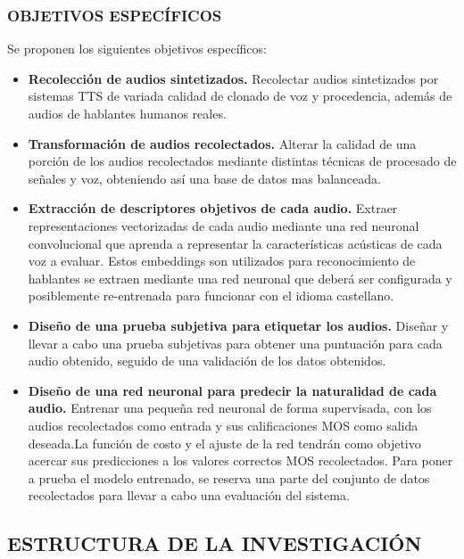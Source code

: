 \subsubsection{OBJETIVOS ESPECÍFICOS}
Se proponen los siguientes objetivos específicos:
\begin{itemize}
    
 \item \textbf{Recolección de audios sintetizados.} 
Recolectar audios sintetizados por sistemas TTS de variada calidad de clonado de voz y procedencia, además de audios de hablantes humanos reales. 
\item \textbf{Transformación de audios recolectados.}
Alterar la calidad de una porción de los audios recolectados mediante distintas técnicas de procesado de señales y voz, obteniendo así una base de datos mas balanceada.
\item \textbf{Extracción de descriptores objetivos de cada audio.}
Extraer representaciones vectorizadas de cada audio mediante una red neuronal convolucional que aprenda a representar la características acústicas de cada voz a evaluar. Estos embeddings son utilizados para reconocimiento de hablantes se extraen mediante una red neuronal que deberá ser configurada y posiblemente re-entrenada para funcionar con el idioma castellano.
\item \textbf{Diseño de una prueba subjetiva para etiquetar los audios. }
Diseñar y llevar a cabo una prueba subjetivas para obtener una puntuación para cada audio obtenido, seguido de una validación de los datos obtenidos.
\item \textbf{ Diseño de una red neuronal para predecir la naturalidad de cada audio.}
Entrenar una pequeña red neuronal de forma supervisada, con los audios recolectados como entrada y sus calificaciones MOS como salida deseada.La función de costo y el ajuste de la red tendrán como objetivo acercar sus predicciones a los valores correctos MOS recolectados. Para poner a prueba el modelo entrenado, se reserva una parte del conjunto de datos recolectados para llevar a cabo una evaluación del sistema.

\end{itemize}

\subsection{ESTRUCTURA DE LA INVESTIGACIÓN}

